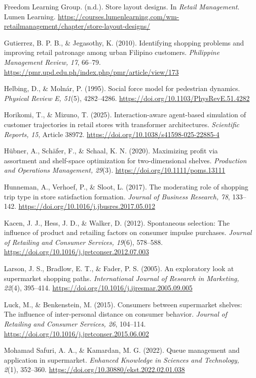 \documentclass[12pt]{article}
\newcommand{\aparef}[1]{\par\noindent\hangindent=0.5in\hangafter=1 #1\par}
\begin{document}
\aparef{Freedom Learning Group. (n.d.). Store layout designs. In \textit{Retail Management}. Lumen Learning. \url{https://courses.lumenlearning.com/wm-retailmanagement/chapter/store-layout-designs/}}

\aparef{Gutierrez, B. P. B., \& Jegasothy, K. (2010). Identifying shopping problems and improving retail patronage among urban Filipino customers. \textit{Philippine Management Review, 17}, 66--79. \url{https://pmr.upd.edu.ph/index.php/pmr/article/view/173}}

\aparef{Helbing, D., \& Moln\'ar, P. (1995). Social force model for pedestrian dynamics. \textit{Physical Review E, 51}(5), 4282--4286. \url{https://doi.org/10.1103/PhysRevE.51.4282}}

\aparef{Horikomi, T., \& Mizuno, T. (2025). Interaction-aware agent-based simulation of customer trajectories in retail stores with transformer architectures. \textit{Scientific Reports, 15}, Article 38972. \url{https://doi.org/10.1038/s41598-025-22885-4}}

\aparef{H\"ubner, A., Sch\"afer, F., \& Schaal, K. N. (2020). Maximizing profit via assortment and shelf-space optimization for two-dimensional shelves. \textit{Production and Operations Management, 29}(3). \url{https://doi.org/10.1111/poms.13111}}

\aparef{Hunneman, A., Verhoef, P., \& Sloot, L. (2017). The moderating role of shopping trip type in store satisfaction formation. \textit{Journal of Business Research, 78}, 133--142. \url{https://doi.org/10.1016/j.jbusres.2017.05.012}}

\aparef{Kacen, J. J., Hess, J. D., \& Walker, D. (2012). Spontaneous selection: The influence of product and retailing factors on consumer impulse purchases. \textit{Journal of Retailing and Consumer Services, 19}(6), 578--588. \url{https://doi.org/10.1016/j.jretconser.2012.07.003}}

\aparef{Larson, J. S., Bradlow, E. T., \& Fader, P. S. (2005). An exploratory look at supermarket shopping paths. \textit{International Journal of Research in Marketing, 22}(4), 395--414. \url{https://doi.org/10.1016/j.ijresmar.2005.09.005}}

\aparef{Luck, M., \& Benkenstein, M. (2015). Consumers between supermarket shelves: The influence of inter-personal distance on consumer behavior. \textit{Journal of Retailing and Consumer Services, 26}, 104--114. \url{https://doi.org/10.1016/j.jretconser.2015.06.002}}

\aparef{Mohamad Safuri, A. A., \& Kamardan, M. G. (2022). Queue management and application in supermarket. \textit{Enhanced Knowledge in Sciences and Technology, 2}(1), 352--360. \url{https://doi.org/10.30880/ekst.2022.02.01.038}}
\end{document}
